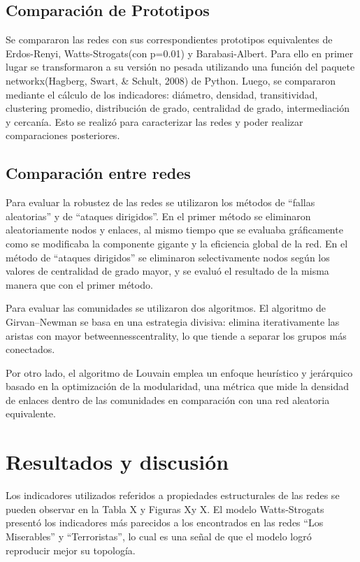 \documentclass{article}
\begin{document}
\subsection{Comparación de Prototipos}

Se compararon las redes con sus correspondientes prototipos equivalentes de Erdos-Renyi, Watts-Strogats(con p=0.01) y Barabasi-Albert. Para ello en primer lugar se transformaron a su versión no pesada utilizando una función del paquete networkx(Hagberg, Swart, & Schult, 2008) de Python. Luego, se compararon mediante el cálculo de los indicadores: diámetro, densidad, transitividad, clustering promedio, distribución de grado, centralidad de grado,  intermediación y cercanía. Esto se realizó para caracterizar las redes y poder realizar comparaciones posteriores.


\subsection{Comparación entre redes}

Para evaluar la robustez de las redes se utilizaron los métodos de “fallas aleatorias” y de “ataques dirigidos”. En el primer método se eliminaron aleatoriamente nodos y enlaces, al mismo tiempo que se evaluaba gráficamente como se modificaba la componente gigante y la eficiencia global de la red. En el método de “ataques dirigidos” se eliminaron selectivamente nodos según los valores de centralidad de grado mayor, y se evaluó el resultado de la misma manera que con el primer método.

Para evaluar las comunidades se utilizaron dos algoritmos. El algoritmo de Girvan–Newman se basa en una estrategia divisiva: elimina iterativamente las aristas con mayor betweennesscentrality, lo que tiende a separar los grupos más conectados.

Por otro lado, el algoritmo de Louvain emplea un enfoque heurístico y jerárquico basado en la optimización de la modularidad, una métrica que mide la densidad de enlaces dentro de las comunidades en comparación con una red aleatoria equivalente. 




\section{Resultados y discusión}

Los indicadores utilizados referidos a propiedades estructurales de las redes se pueden observar en la Tabla X y Figuras Xy X. El modelo Watts-Strogats presentó los indicadores más parecidos a los encontrados en las redes “Los Miserables” y “Terroristas”, lo cual es una señal de que el modelo logró reproducir mejor su topología. 
\end{document}

